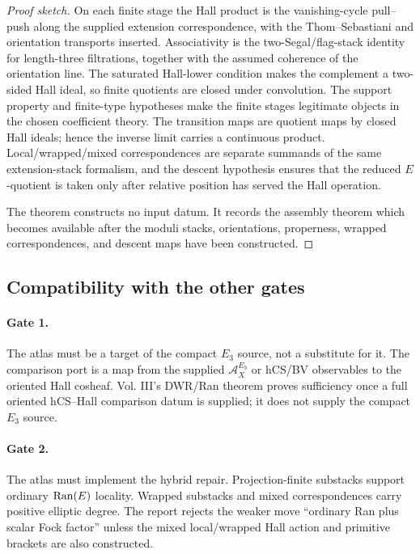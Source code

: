 \begin{proof}[Proof sketch]
On each finite stage the Hall product is the vanishing-cycle
pull--push along the supplied extension correspondence, with the
Thom--Sebastiani and orientation transports inserted.  Associativity is
the two-Segal/flag-stack identity for length-three filtrations,
together with the assumed coherence of the orientation line.  The
saturated Hall-lower condition makes the complement a two-sided Hall
ideal, so finite quotients are closed under convolution.  The support
property and finite-type hypotheses make the finite stages legitimate
objects in the chosen coefficient theory.  The transition maps are
quotient maps by closed Hall ideals; hence the inverse limit carries a
continuous product.  Local/wrapped/mixed correspondences are separate
summands of the same extension-stack formalism, and the descent
hypothesis ensures that the reduced \(E\)-quotient is taken only after
relative position has served the Hall operation.

The theorem constructs no input datum.  It records the assembly theorem
which becomes available after the moduli stacks, orientations,
properness, wrapped correspondences, and descent maps have been
constructed.
\end{proof}

\subsection{Compatibility with the other gates}

\paragraph{Gate 1.}
The atlas must be a target of the compact \(E_3\) source, not a
substitute for it.  The comparison port is a map from the supplied
\(\mathcal A_X^{E_3}\) or hCS/BV observables to the oriented Hall
cosheaf.  Vol. III's DWR/Ran theorem proves sufficiency once a full
oriented hCS--Hall comparison datum is supplied; it does not supply the
compact \(E_3\) source.

\paragraph{Gate 2.}
The atlas must implement the hybrid repair.  Projection-finite
substacks support ordinary \(\operatorname{Ran}(E)\) locality.  Wrapped substacks and
mixed correspondences carry positive elliptic degree.  The report
rejects the weaker move ``ordinary Ran plus scalar Fock factor'' unless
the mixed local/wrapped Hall action and primitive brackets are also
constructed.

